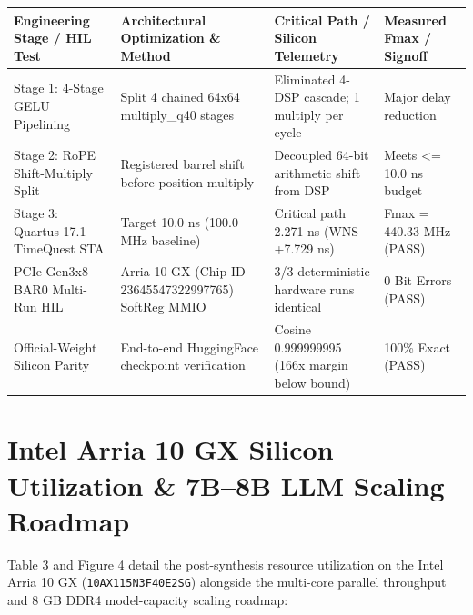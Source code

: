 \documentclass[11pt,a4paper]{article}
\begin{document}
{\footnotesize\renewcommand{\arraystretch}{1.14}\begin{longtable}{@{}L{0.23\textwidth}L{0.27\textwidth}L{0.24\textwidth}L{0.16\textwidth}@{}}\toprule

\textbf{Engineering Stage /\allowbreak{} HIL Test} & \textbf{Architectural Optimization \& Method} & \textbf{Critical Path /\allowbreak{} Silicon Telemetry} & \textbf{Measured Fmax /\allowbreak{} Signoff}\\\midrule\endhead

Stage 1: 4-Stage GELU Pipelining & Split 4 chained 64x64 multiply\_\allowbreak{}q40 stages & Eliminated 4-DSP cascade; 1 multiply per cycle & Major delay reduction\\[2pt]

Stage 2: RoPE Shift-Multiply Split & Registered barrel shift before position multiply & Decoupled 64-bit arithmetic shift from DSP & Meets <=\allowbreak{} 10.0 ns budget\\[2pt]

Stage 3: Quartus 17.1 TimeQuest STA & Target 10.0 ns (\allowbreak{}100.0 MHz baseline)\allowbreak{} & Critical path 2.271 ns (\allowbreak{}WNS +\allowbreak{}7.729 ns)\allowbreak{} & Fmax =\allowbreak{} 440.33 MHz (\allowbreak{}PASS)\allowbreak{}\\[2pt]

PCIe Gen3x8 BAR0 Multi-Run HIL & Arria 10 GX (\allowbreak{}Chip ID 23645547\allowbreak{}32299776\allowbreak{}5)\allowbreak{} SoftReg MMIO & 3/\allowbreak{}3 deterministic hardware runs identical & 0 Bit Errors (\allowbreak{}PASS)\allowbreak{}\\[2pt]

Official-Weight Silicon Parity & End-to-end HuggingFace checkpoint verification & Cosine 0.99999999\allowbreak{}5 (\allowbreak{}166x margin below bound)\allowbreak{} & 100\% Exact (\allowbreak{}PASS)\allowbreak{}\\[2pt]

\bottomrule\end{longtable}}

\section{Intel Arria 10 GX Silicon Utilization \& 7B--8B LLM Scaling Roadmap}

Table 3 and Figure 4 detail the post-synthesis resource utilization on the Intel Arria 10 GX (\texttt{10AX115N3F40E2SG}) alongside the multi-core parallel throughput and 8 GB DDR4 model-capacity scaling roadmap:
\end{document}
